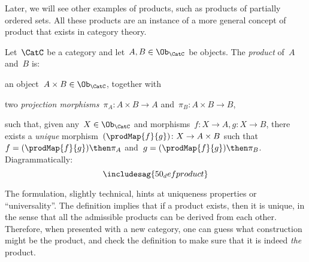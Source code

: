 Later, we will see other examples of products, such as products of partially ordered sets.
All these products are an instance of a more general concept of product that exists in category
theory.
 

\begin{ctdefinition}
Let~$\CatC$ be a category and let~$A,B\in \Ob_{\CatC}$ be objects. The \emph{product} of~$A$ and~$B$ is:
\begin{compactenum}
    \item an object~$A \times B \in \Ob_{\CatC}$, together with
    \item two \emph{projection morphisms}~$\pi_A \colon A \times B \to A$ and~$\pi_B \colon A \times B \to B$,
\end{compactenum} 
such that, given any~$X \in \Ob_{\CatC}$ and morphisms~$f \colon X \to A, g \colon X \to B$, there exists a \emph{unique} morphism~$(\prodMap{f}{g}) \colon X \to A \times B$ such that~$f = (\prodMap{f}{g})\then \pi_A$ and~$g=(\prodMap{f}{g})\then \pi_B$. Diagrammatically:
\begin{equation}
\includesag{50_defproduct}
\end{equation}
\end{ctdefinition} 

The formulation, slightly technical, hints at uniqueness properties or ``universality''. The definition implies that if a product exists, then it is unique, in the sense that all the admissible products can be derived from each other. Therefore, when presented with a new category, one can guess what construction might be the product, and check the definition to make sure that it is indeed \emph{the} product.

